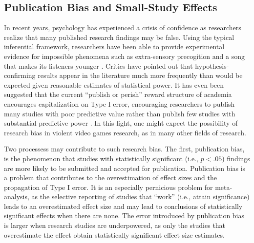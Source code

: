 \documentclass[man]{apa6}
\begin{document}
\subsection{Publication Bias and Small-Study Effects}
In recent years, psychology has experienced a crisis of confidence as researchers realize that many published research findings may be false. Using the typical inferential framework, researchers have been able to provide experimental evidence for impossible phenomena such as extra-sensory precogition \citep[psi][]{Bem:2011} and a song that makes its listeners younger \citep{Simmons:etal:2011}. Critics have pointed out that hypothesis-confirming results appear in the literature much more frequently than would be expected given reasonable estimates of statistical power. %
It has even been suggested that the current ``publish or perish'' reward structure of academia encourages capitalization on Type I error, encouraging researchers to publish many studies with poor predictive value rather than publish few studies with substantial predictive power \citep{Bakker:etal:2011}. In this light, one might expect the possibility of research bias in violent video games research, as in many other fields of research. 

Two processess may contribute to such research bias. The first, publication bias, is the phenomenon that studies with statistically significant (i.e., $p<.05$) findings are more likely to be submitted and accepted for publication. Publication bias is a problem that contributes to the overestimation of effect sizes and the propagation of Type I error. It is an especially pernicious problem for meta-analysis, as the selective reporting of studies that ``work'' (i.e., attain significance) leads to an overestimated effect size and may lead to conclusions of statistically significant effects when there are none. The error introduced by publication bias is larger when research studies are underpowered, as only the studies that overestimate the effect obtain statistically significant effect size estimates.
\end{document}

